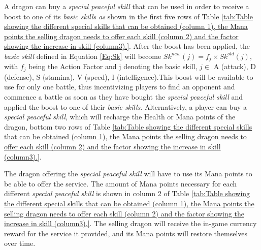 \documentclass[12pt]{article}
\begin{document}
{A dragon can buy a \textit{special peaceful skill} that can be used in order to receive a boost to one of its \textit{basic skills as }shown in the first five rows of  Table \ref{tab:Table showing the different special skills that can be obtained (column 1), the Mana points the selling dragon needs to offer each skill (column 2) and the factor showing the increase in skill (column3).}. After the boost has been applied, the \textit{basic skill }defined in Equation \ref{Eq:Sk} will become $Sk^{new}(j)=f_j\times Sk^{old}(j)$, with $f_j$ being the Action Factor and j denoting the basic skill, $j \in$  {A (attack), D (defense), S (stamina), V (speed), I (intelligence)}.This boost will be available to use for only one battle, thus incentivizing players to find an opponent and commence a battle as soon as they have bought the \textit{special peaceful skill }and applied the boost to one of their \textit{basic skills}. Alternatively, a player can buy a \textit{special peaceful skill}, which will recharge the Health or Mana points of the dragon, bottom two rows of  Table \ref{tab:Table showing the different special skills that can be obtained (column 1), the Mana points the selling dragon needs to offer each skill (column 2) and the factor showing the increase in skill (column3).}.\par

The dragon offering the \textit{special peaceful skill} will have to use its Mana points to be able to offer the service. The amount of Mana points necessary for each different \textit{special peaceful skill} is shown in column 2 of  Table \ref{tab:Table showing the different special skills that can be obtained (column 1), the Mana points the selling dragon needs to offer each skill (column 2) and the factor showing the increase in skill (column3).}. The selling dragon will receive the in-game currency reward for the service it provided, and its Mana points will restore themselves over time.\par





}
\end{document}

